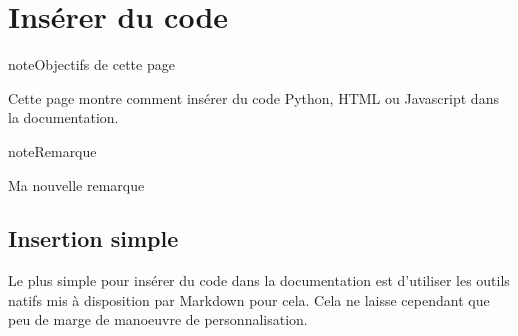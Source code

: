 \documentclass[a4,10pt,french]{sphinxmanual}
\begin{document}
\section{Insérer du code}
\label{\detokenize{tutoriel-sphinx/inserer-code:inserer-du-code}}\label{\detokenize{tutoriel-sphinx/inserer-code::doc}}
\begin{sphinxadmonition}{note}{Objectifs de cette page}

\sphinxAtStartPar
Cette page montre comment insérer du code Python, HTML ou Javascript dans la documentation.
\end{sphinxadmonition}

\begin{sphinxadmonition}{note}{Remarque}

\sphinxAtStartPar
Ma nouvelle remarque
\end{sphinxadmonition}


\subsection{Insertion simple}
\label{\detokenize{tutoriel-sphinx/inserer-code:insertion-simple}}
\sphinxAtStartPar
Le plus simple pour insérer du code dans la documentation est d’utiliser les outils natifs mis à disposition par Markdown pour cela. Cela ne laisse cependant que peu de marge de manoeuvre de personnalisation.

\begin{sphinxVerbatim}[commandchars=\\\{\}]
   

  
       

 
\end{sphinxVerbatim}

\begin{sphinxVerbatim}[commandchars=\\\{\}]
   
\end{sphinxVerbatim}

\begin{sphinxVerbatim}[commandchars=\\\{\}]
\end{sphinxVerbatim}
\end{document}
